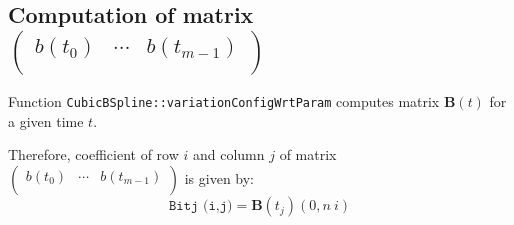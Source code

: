\documentclass {article}
\newcommand\B{\textbf{B}}
\begin{document}
\subsection*{Computation of matrix $\left(\begin{array}{ccc}b (t_0) & \cdots & b(t_{m-1}) \\\end{array}\right)$}

Function \texttt{CubicBSpline::variationConfigWrtParam} computes matrix $\B(t)$
for a given time $t$.

Therefore, coefficient of row $i$ and column $j$ of matrix $\left(\begin{array}{ccc}b (t_0) & \cdots & b(t_{m-1}) \\\end{array}\right)$ is given by:
$$
  \texttt{Bitj (i,j)} = \B (t_j) (0,n\ i)
$$
\end{document}

